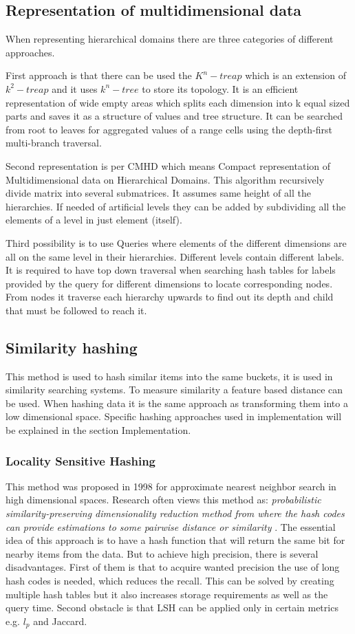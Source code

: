 \subsection{Representation of multidimensional data}
When representing hierarchical domains there are three categories of different approaches.

First approach is that there can be used the $K^n-treap$ which is an extension of $k^2-treap$ and it uses $k^n-tree$ to store its topology. It is an efficient representation of wide empty areas which splits each dimension into k equal sized parts and saves it as a structure of values and tree structure. It can be searched from root to leaves for aggregated values of a range cells using the depth-first multi-branch traversal.

Second representation is per CMHD which means Compact representation of Multidimensional data on Hierarchical Domains. This algorithm recursively divide matrix into several submatrices. It assumes same height of all the hierarchies. If needed of artificial levels they can be added by subdividing all the elements of a level in just element (itself).

Third possibility is to use Queries where elements of the different dimensions are all on the same level in their hierarchies. Different levels contain different labels. It is required to have top down traversal when searching hash tables for labels provided by the query for different dimensions to locate corresponding nodes. From nodes it traverse each hierarchy upwards to find out its depth and child that must be followed to reach it. \cite{efficientRepre}
\subsection{Similarity hashing}
This method is used to hash similar items into the same buckets, it is used in similarity searching systems. To measure similarity a feature based distance can be used. When hashing data it is the same approach as transforming them into a low dimensional space. Specific hashing approaches used in implementation will be explained in the section Implementation.

\subsubsection{Locality Sensitive Hashing}
This method was proposed in 1998 for approximate nearest neighbor search in high dimensional spaces. Research often views this method as: \textit{probabilistic similarity-preserving dimensionality reduction method from where the hash codes can provide estimations to some pairwise distance or similarity}  \cite{hashing}. The essential idea of this approach is to have a hash function that will return the same bit for nearby items from the data. But to achieve high precision, there is several disadvantages. First of them is that to acquire wanted precision the use of long hash codes is needed, which reduces the recall. This can be solved by creating multiple hash tables but it also increases storage requirements as well as the query time. Second obstacle is that LSH can be applied only in certain metrics e.g. $l_p$ and Jaccard. 

